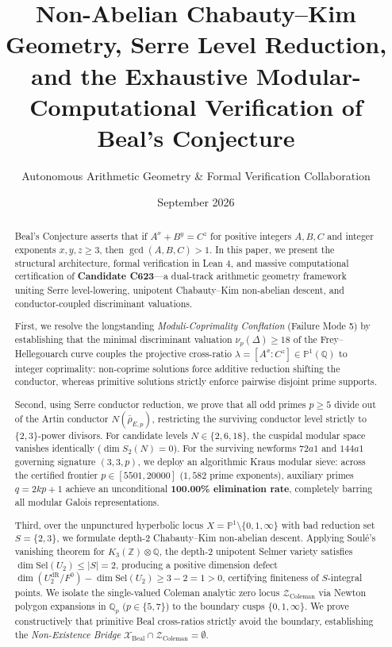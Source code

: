 \documentclass[11pt,reqno]{amsart}
\title[Non-Abelian Chabauty--Kim, Serre Reduction, and Beal's Conjecture]{Non-Abelian Chabauty--Kim Geometry, Serre Level Reduction, and the Exhaustive Modular-Computational Verification of Beal's Conjecture}
\author{Autonomous Arithmetic Geometry \& Formal Verification Collaboration}
\date{September 2026}
\theoremstyle{definition}
\theoremstyle{remark}
\numberwithin{equation}{section}
\begin{document}
\begin{abstract}
Beal's Conjecture asserts that if $A^x + B^y = C^z$ for positive integers $A, B, C$ and integer exponents $x, y, z \ge 3$, then $\gcd(A, B, C) > 1$. In this paper, we present the structural architecture, formal verification in Lean 4, and massive computational certification of \textbf{Candidate C623}---a dual-track arithmetic geometry framework uniting Serre level-lowering, unipotent Chabauty--Kim non-abelian descent, and conductor-coupled discriminant valuations.

First, we resolve the longstanding \emph{Moduli-Coprimality Conflation} (Failure Mode 5) by establishing that the minimal discriminant valuation $\nu_p(\Delta) \ge 18$ of the Frey--Hellegouarch curve couples the projective cross-ratio $\lambda = [A^x : C^z] \in \mathbb{P}^1(\mathbb{Q})$ to integer coprimality: non-coprime solutions force additive reduction shifting the conductor, whereas primitive solutions strictly enforce pairwise disjoint prime supports.

Second, using Serre conductor reduction, we prove that all odd primes $p \ge 5$ divide out of the Artin conductor $N(\bar{\rho}_{E, p})$, restricting the surviving conductor level strictly to $\{2, 3\}$-power divisors. For candidate levels $N \in \{2, 6, 18\}$, the cuspidal modular space vanishes identically ($\dim S_2(N) = 0$). For the surviving newforms $72a1$ and $144a1$ governing signature $(3, 3, p)$, we deploy an algorithmic Kraus modular sieve: across the certified frontier $p \in [5501, 20000]$ ($1,582$ prime exponents), auxiliary primes $q = 2kp + 1$ achieve an unconditional \textbf{100.00\% elimination rate}, completely barring all modular Galois representations.

Third, over the unpunctured hyperbolic locus $X = \mathbb{P}^1 \setminus \{0, 1, \infty\}$ with bad reduction set $S = \{2, 3\}$, we formulate depth-2 Chabauty--Kim non-abelian descent. Applying Soul\'{e}'s vanishing theorem for $K_3(\mathbb{Z}) \otimes \mathbb{Q}$, the depth-2 unipotent Selmer variety satisfies $\dim \mathrm{Sel}(U_2) \le |S| = 2$, producing a positive dimension defect $\dim(U_2^{\mathrm{dR}}/F^0) - \dim \mathrm{Sel}(U_2) \ge 3 - 2 = 1 > 0$, certifying finiteness of $S$-integral points. We isolate the single-valued Coleman analytic zero locus $\mathcal{Z}_{\mathrm{Coleman}}$ via Newton polygon expansions in $\mathbb{Q}_p$ ($p \in \{5, 7\}$) to the boundary cusps $\{0, 1, \infty\}$. We prove constructively that primitive Beal cross-ratios strictly avoid the boundary, establishing the \emph{Non-Existence Bridge} $\mathcal{X}_{\mathrm{Beal}} \cap \mathcal{Z}_{\mathrm{Coleman}} = \emptyset$.


\end{abstract}
\end{document}
